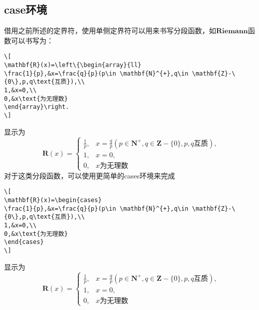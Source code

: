 \subsection{case环境}
借用之前所述的定界符，使用单侧定界符可以用来书写分段函数，如$\textbf{Riemann}$函数可以书写为：
\begin{verbatim}
\[
\mathbf{R}(x)=\left\{\begin{array}{ll}
\frac{1}{p},&x=\frac{q}{p}(p\in \mathbf{N}^{+},q\in \mathbf{Z}-\{0\},p,q\text{互质}),\\
1,&x=0,\\
0,&x\text{为无理数}
\end{array}\right.
\]
\end{verbatim}
显示为
\[
\mathbf{R}(x)=\left\{\begin{array}{ll}
\frac{1}{p},&x=\frac{q}{p}(p\in \mathbf{N}^{+},q\in \mathbf{Z}-\{0\},p,q\text{互质}),\\
1,&x=0,\\
0,&x\text{为无理数}
\end{array}\right.
\]
对于这类分段函数，可以使用更简单的cases环境来完成
\begin{verbatim}
\[
\mathbf{R}(x)=\begin{cases}
\frac{1}{p},&x=\frac{q}{p}(p\in \mathbf{N}^{+},q\in \mathbf{Z}-\{0\},p,q\text{互质}),\\
1,&x=0,\\
0,&x\text{为无理数}
\end{cases}
\]
\end{verbatim}
显示为
\[
\mathbf{R}(x)=\begin{cases}
\frac{1}{p},&x=\frac{q}{p}(p\in \mathbf{N}^{+},q\in \mathbf{Z}-\{0\},p,q\text{互质}),\\
1,&x=0,\\
0,&x\text{为无理数}
\end{cases}
\]